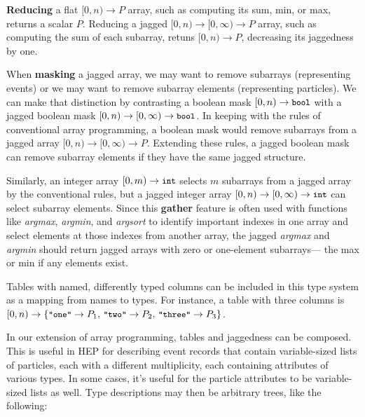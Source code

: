 \documentclass{webofc}
\begin{document}
{\bf Reducing} a flat $[0, n) \to P$ array, such as computing its sum, min, or max, returns a scalar $P$. Reducing a jagged $[0, n) \to [0, \infty) \to P$ array, such as computing the sum of each subarray, retuns $[0, n) \to P$, decreasing its jaggedness by one.

When {\bf masking} a jagged array, we may want to remove subarrays (representing events) or we may want to remove subarray elements (representing particles). We can make that distinction by contrasting a boolean mask $[0, n) \to \mbox{\small\tt bool}$ with a jagged boolean mask $[0, n) \to [0, \infty) \to \mbox{\small\tt bool}$. In keeping with the rules of conventional array programming, a boolean mask would remove subarrays from a jagged array $[0, n) \to [0, \infty) \to P$. Extending these rules, a jagged boolean mask can remove subarray elements if they have the same jagged structure.

Similarly, an integer array $[0, m) \to \mbox{\small\tt int}$ selects $m$ subarrays from a jagged array by the conventional rules, but a jagged integer array $[0, n) \to [0, \infty) \to \mbox{\small\tt int}$ can select subarray elements. Since this {\bf gather} feature is often used with functions like {\it argmax}, {\it argmin}, and {\it argsort} to identify important indexes in one array and select elements at those indexes from another array, the jagged {\it argmax} and {\it argmin} should return jagged arrays with zero or one-element subarrays--- the max or min if any elements exist.

Tables with named, differently typed columns can be included in this type system as a mapping from names to types. For instance, a table with three columns is $[0, n) \to \{\mbox{\small\tt "one"} \to P_1\mbox{, }\mbox{\small\tt "two"} \to P_2\mbox{, }\mbox{\small\tt "three"} \to P_3\}$.


In our extension of array programming, tables and jaggedness can be composed. This is useful in HEP for describing event records that contain variable-sized lists of particles, each with a different multiplicity, each containing attributes of various types. In some cases, it's useful for the particle attributes to be variable-sized lists as well. Type descriptions may then be arbitrary trees, like the following:
\end{document}

